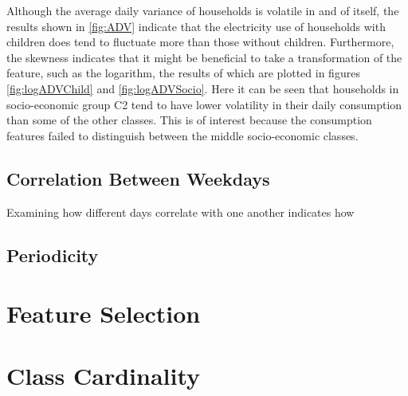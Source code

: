 \ADV

Although the average daily variance of households is volatile in and of itself, the results shown in \ref{fig:ADV} indicate that the electricity use of households with children does tend to fluctuate more than those without children. Furthermore, the skewness indicates that it might be beneficial to take a transformation of the feature, such as the logarithm, the results of which are plotted in figures \ref{fig:logADVChild} and \ref{fig:logADVSocio}. Here it can be seen that households in socio-economic group C2 tend to have lower volatility in their daily consumption than some of the other classes. This is of interest because the consumption features failed to distinguish between the middle socio-economic classes.

\logADVChild
\logADVSocio

\subsection*{Correlation Between Weekdays}
Examining how different days correlate with one another indicates how

\corrChild
\corrSocio
\subsection{Periodicity}
		

\section{Feature Selection}

\section{Class Cardinality}